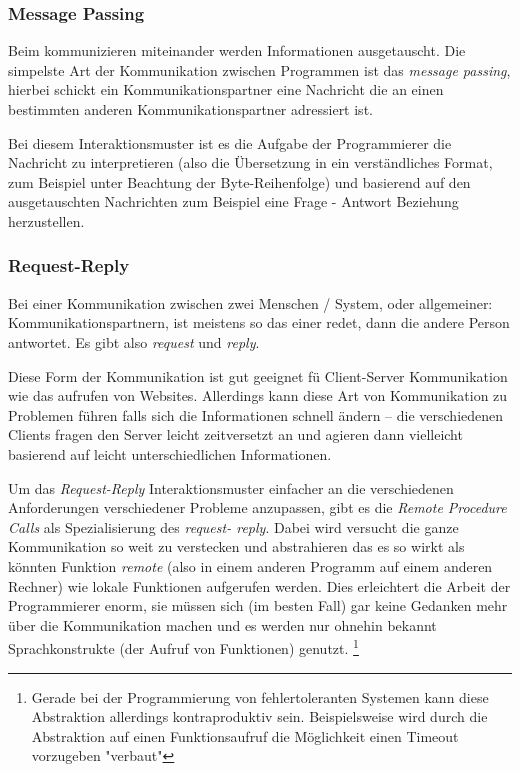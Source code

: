 \subsubsection{Message Passing}
Beim kommunizieren miteinander werden Informationen ausgetauscht. Die simpelste Art der Kommunikation zwischen
Programmen ist das \textit{message passing}, hierbei schickt ein Kommunikationspartner eine Nachricht die an einen bestimmten anderen
Kommunikationspartner adressiert ist.

Bei diesem Interaktionsmuster ist es die Aufgabe der Programmierer die Nachricht zu interpretieren
(also die {\"{U}}bersetzung in ein verst{\"{a}}ndliches Format, zum Beispiel unter Beachtung der Byte-Reihenfolge) und
basierend auf den ausgetauschten Nachrichten zum Beispiel eine Frage - Antwort Beziehung herzustellen.


\subsubsection{Request-Reply}
Bei einer Kommunikation zwischen zwei Menschen / System, oder allgemeiner: Kommunikationspartnern,
ist meistens so das einer redet, dann die andere Person antwortet. Es gibt also \textit{request}
und \textit{reply}.

Diese Form der Kommunikation ist gut geeignet f{\"{u}} Client-Server Kommunikation wie das
aufrufen von Websites. Allerdings kann diese Art von Kommunikation zu Problemen f{\"{u}}hren falls sich die
Informationen schnell {\"{a}}ndern -- die verschiedenen Clients fragen den Server leicht zeitversetzt an und
agieren dann vielleicht basierend auf leicht unterschiedlichen Informationen.

Um das \textit{Request-Reply} Interaktionsmuster einfacher an die verschiedenen Anforderungen verschiedener
Probleme anzupassen, gibt es die \textit{Remote Procedure Calls} als Spezialisierung des \textit{request-
reply}. Dabei wird versucht die ganze Kommunikation so weit zu verstecken und abstrahieren das es so wirkt
als k{\"{o}}nnten Funktion \textit{remote} (also in einem anderen Programm auf einem anderen Rechner) wie
lokale Funktionen aufgerufen werden. Dies erleichtert die Arbeit der Programmierer enorm, sie m{\"{u}}ssen
sich (im besten Fall) gar keine Gedanken mehr {\"{u}}ber die Kommunikation machen und es werden nur
ohnehin bekannt Sprachkonstrukte (der Aufruf von Funktionen) genutzt.
\footnote{Gerade bei der Programmierung von fehlertoleranten Systemen kann diese Abstraktion allerdings
kontraproduktiv sein. Beispielsweise wird durch die Abstraktion auf einen Funktionsaufruf die M{\"{o}}glichkeit
einen Timeout vorzugeben "verbaut"}

